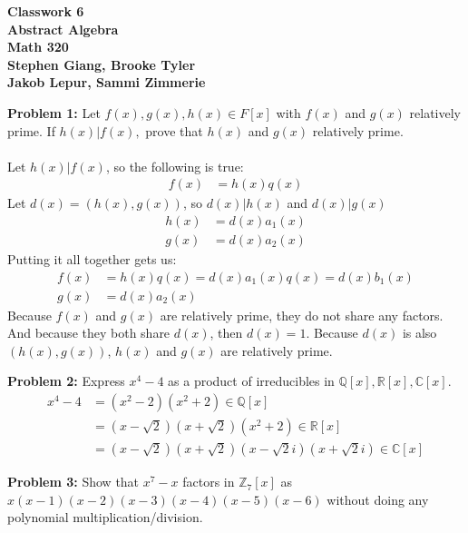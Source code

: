 \documentclass[12pt]{article}
\begin{document}
	
	\begin{center}
		\textbf{Classwork 6} \\
		\textbf{Abstract Algebra} \\
		\textbf{Math 320} \\
		\textbf{Stephen Giang, Brooke Tyler} \\
		\textbf{Jakob Lepur, Sammi Zimmerie}
	\end{center}

\noindent \textbf{Problem 1: }Let $f(x),g(x),h(x) \in F[x]$ with $f(x)$ and $g(x)$ relatively prime. If $h(x)|f(x),$ prove that $h(x)$ and $g(x)$ relatively prime. 
\\ \\

\noindent Let $h(x)|f(x)$, so the following is true:
	\begin{align*}
		f(x) &= h(x)q(x)
	\end{align*}
Let $d(x) = (h(x),g(x))$, so $d(x)|h(x)$ and $d(x)|g(x)$
	\begin{align*}
		h(x) &= d(x)a_1(x) \\
		g(x) &= d(x)a_2(x)
	\end{align*}
Putting it all together gets us:
	\begin{align*}
		f(x) &= h(x)q(x) = d(x)a_1(x)q(x) = d(x)b_1(x) \\
		g(x) &= d(x)a_2(x)
	\end{align*}
Because $f(x)$ and $g(x)$ are relatively prime, they do not share any factors. And because they both share $d(x)$, then $d(x) = 1$.  Because $d(x)$ is also $(h(x),g(x))$, $h(x)$ and $g(x)$ are relatively prime.

\newpage 

\noindent \textbf{Problem 2: }Express $x^4 - 4$ as a product of irreducibles in $\mathbb{Q}[x], \mathbb{R}[x], \mathbb{C}[x]$.
	\begin{align*}
		x^4 - 4 &= (x^2 - 2)(x^2 + 2) \in \mathbb{Q}[x] \\
		&= (x - \sqrt{2})(x + \sqrt{2})(x^2 + 2) \in \mathbb{R}[x] \\
		&= (x - \sqrt{2})(x + \sqrt{2})(x - \sqrt{2}i)(x + \sqrt{2}i) \in \mathbb{C}[x]
	\end{align*} 

\newpage 

\noindent \textbf{Problem 3: }Show that $x^7 - x$ factors in $\mathbb{Z}_7[x]$ as $x(x - 1)(x - 2)(x - 3)(x - 4)(x - 5)(x - 6)$ without doing any polynomial multiplication/division.
\\ \\
\end{document}
